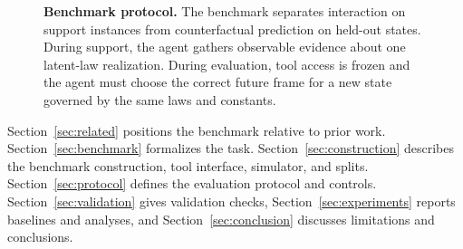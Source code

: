 \begin{figure}[t]
  \centering
  \caption{\textbf{Benchmark protocol.} The benchmark separates interaction on support instances from counterfactual prediction on held-out states. During support, the agent gathers observable evidence about one latent-law realization. During evaluation, tool access is frozen and the agent must choose the correct future frame for a new state governed by the same laws and constants.}
  \label{fig:hero}
\end{figure}

Section~\ref{sec:related} positions the benchmark relative to prior work. Section~\ref{sec:benchmark} formalizes the task. Section~\ref{sec:construction} describes the benchmark construction, tool interface, simulator, and splits. Section~\ref{sec:protocol} defines the evaluation protocol and controls. Section~\ref{sec:validation} gives validation checks, Section~\ref{sec:experiments} reports baselines and analyses, and Section~\ref{sec:conclusion} discusses limitations and conclusions.
